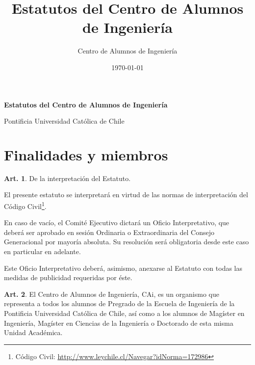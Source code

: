 \documentclass[letterpaper,11pt]{article}
\title{Estatutos del Centro de Alumnos de Ingeniería}
\author{Centro de Alumnos de Ingeniería}
\date{\today}
\theoremstyle{definition}%
\newtheorem{art}{Art.} %
\begin{document}
\thispagestyle{plain}
\vspace*{-75pt}

\begin{center}
	\begin{Large}
		{\bf
			Estatutos del Centro de Alumnos de Ingeniería

			Pontificia Universidad Católica de Chile
		}
	\end{Large}

	\vspace*{30pt}

\end{center}

\section{Finalidades y miembros}\label{finalidades}

\begin{art}\label{interpretacionEstatuto}
	De la interpretación del Estatuto.

	El presente estatuto se interpretará en virtud de las normas de interpretación del Código Civil\footnote{Código Civil: \url{http://www.leychile.cl/Navegar?idNorma=172986}}.

	En caso de vacío, el Comité Ejecutivo dictará un Oficio Interpretativo, que deberá ser aprobado en sesión Ordinaria o Extraordinaria del Consejo Generacional por mayoría absoluta. Su resolución será obligatoria desde este caso en particular en adelante.

	Este Oficio Interpretativo deberá, asimismo, anexarse al Estatuto con todas las medidas de publicidad requeridas por éste.
\end{art}

\begin{art}\label{representacionCAi}
	El Centro de Alumnos de Ingeniería, CAi, es un organismo que representa a todos los alumnos de Pregrado de la Escuela de Ingeniería de la Pontificia Universidad Católica de Chile, así como a los alumnos de Magíster en Ingeniería, Magíster en Ciencias de la Ingeniería o Doctorado de esta misma Unidad Académica.
\end{art}
\end{document}
